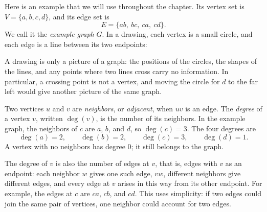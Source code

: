 Here is an example that we will use throughout the chapter. Its vertex set is $V=\{a,b,c,d\}$, and its edge set is
\[
E=\{ab,\ bc,\ ca,\ cd\}.
\]
We call it the \emph{example graph} $G$. In a drawing, each vertex is a small circle, and each edge is a line between its two endpoints:
\begin{center}
\end{center}
A drawing is only a picture of a graph: the positions of the circles, the shapes of the lines, and any points where two lines cross carry no information. In particular, a crossing point is not a vertex, and moving the circle for $d$ to the far left would give another picture of the same graph.

Two vertices $u$ and $v$ are \emph{neighbors}, or \emph{adjacent}, when $uv$ is an edge. The \emph{degree} of a vertex $v$, written $\deg(v)$, is the number of its neighbors. In the example graph, the neighbors of $c$ are $a$, $b$, and $d$, so $\deg(c)=3$. The four degrees are
\[
\deg(a)=2,\qquad\deg(b)=2,\qquad\deg(c)=3,\qquad\deg(d)=1.
\]
A vertex with no neighbors has degree $0$; it still belongs to the graph.

The degree of $v$ is also the number of edges at $v$, that is, edges with $v$ as an endpoint: each neighbor $w$ gives one such edge, $vw$, different neighbors give different edges, and every edge at $v$ arises in this way from its other endpoint. For example, the edges at $c$ are $ca$, $cb$, and $cd$. This uses simplicity: if two edges could join the same pair of vertices, one neighbor could account for two edges.


